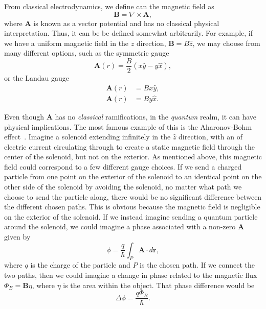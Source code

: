 From classical electrodynamics, we define can the magnetic field as
\begin{equation}
\mathbf{B} = \nabla \times \mathbf{A},
\end{equation}
where $\mathbf{A}$ is known as a vector potential and has no classical physical interpretation.
Thus, it can be be defined somewhat arbitrarily.
For example, if we have a uniform magnetic field in the $\hat z$ direction, $\mathbf{B} = B \hat z$, we may choose from many different options, such as the symmetric gauge
\begin{equation}
\mathbf{A}(r) = \frac{B}{2}(x \hat y - y \hat x),
\end{equation}
or the Landau gauge
\begin{equation}
\begin{split}
\mathbf{A}(r) &= Bx \hat y, \\
\mathbf{A}(r) &= By \hat x.
\end{split}
\end{equation}

Even though $\mathbf{A}$ has no \textit{classical} ramifications, in the \textit{quantum} realm, it can have physical implications.
The most famous example of this is the Aharonov-Bohm effect~\cite{Aharonov1959}. 
Imagine a solenoid extending infinitely in the $\hat z$ direction, with an of electric current circulating through to create a static magnetic field through the center of the solenoid, but not on the exterior. 
As mentioned above, this magnetic field could correspond to a few different gauge choices.
If we send a charged particle from one point on the exterior of the solenoid to an identical point on the other side of the solenoid by avoiding the solenoid, no matter what path we choose to send the particle along, there would be no significant difference between the different chosen paths.
This is obvious because the magnetic field is negligible on the exterior of the solenoid.
If we instead imagine sending a quantum particle around the solenoid, we could imagine a phase associated with a non-zero $\mathbf{A}$ given by
\begin{equation}
\phi = \frac{q}{\hbar}\int_P \mathbf{A} \cdot d\mathbf{r},
\end{equation}
where $q$ is the charge of the particle and $P$ is the chosen path.
If we connect the two paths, then we could imagine a change in phase related to the magnetic flux $\Phi_B = \mathbf{B}\eta$, where $\eta$ is the area within the object. 
That phase difference would be
\begin{equation}
\Delta\phi = \frac{q\Phi_B}{\hbar}.
\end{equation}

